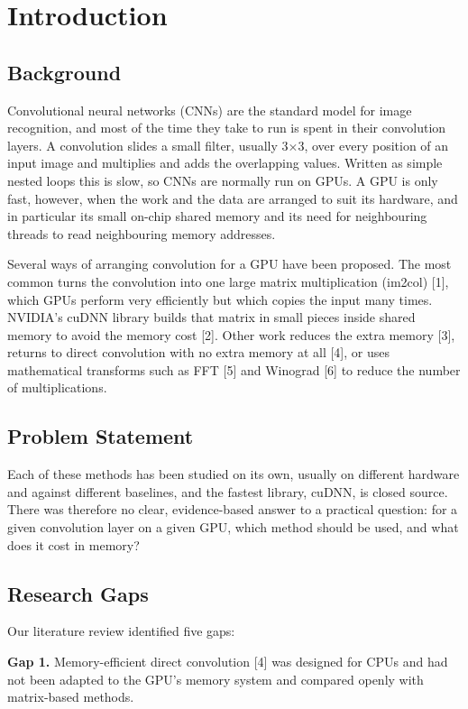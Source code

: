 \documentclass[12pt,a4paper]{article}
\begin{document}
\section{Introduction}
\subsection{Background}
Convolutional neural networks (CNNs) are the standard model for image recognition, and most of the time they take to run is spent in their convolution layers. A convolution slides a small filter, usually 3×3, over every position of an input image and multiplies and adds the overlapping values. Written as simple nested loops this is slow, so CNNs are normally run on GPUs. A GPU is only fast, however, when the work and the data are arranged to suit its hardware, and in particular its small on-chip shared memory and its need for neighbouring threads to read neighbouring memory addresses.

Several ways of arranging convolution for a GPU have been proposed. The most common turns the convolution into one large matrix multiplication (im2col) [1], which GPUs perform very efficiently but which copies the input many times. NVIDIA's cuDNN library builds that matrix in small pieces inside shared memory to avoid the memory cost [2]. Other work reduces the extra memory [3], returns to direct convolution with no extra memory at all [4], or uses mathematical transforms such as FFT [5] and Winograd [6] to reduce the number of multiplications.

\subsection{Problem Statement}
Each of these methods has been studied on its own, usually on different hardware and against different baselines, and the fastest library, cuDNN, is closed source. There was therefore no clear, evidence-based answer to a practical question: for a given convolution layer on a given GPU, which method should be used, and what does it cost in memory?

\subsection{Research Gaps}
Our literature review identified five gaps:

\textbf{Gap 1.} Memory-efficient direct convolution [4] was designed for CPUs and had not been adapted to the GPU's memory system and compared openly with matrix-based methods.
\end{document}
